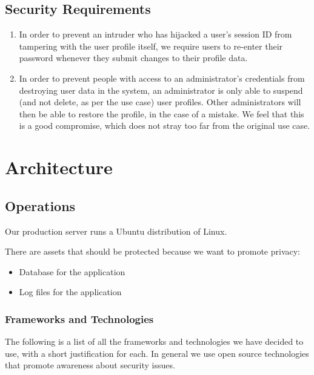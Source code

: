 \documentclass[a4paper]{article}
\begin{document}
\subsection{Security Requirements}
\begin{enumerate}
\item In order to prevent an intruder who has hijacked a user's session ID from tampering with the user profile itself, we require users to re-enter their password whenever they submit changes to their profile data.
\item In order to prevent people with access to an administrator's credentials from destroying user data in the system, an administrator is only able to suspend (and not delete, as per the use case) user profiles. Other administrators will then be able to restore the profile, in the case of a mistake. We feel that this is a good compromise, which does not stray too far from the original use case.
\end{enumerate}

\section{Architecture}\label{sec:architecture}


\subsection{Operations}
Our production server runs a Ubuntu distribution of Linux.

There are assets that should be protected because we want to promote privacy:
\begin{itemize}
\item Database for the application
\item Log files for the application
\end{itemize}

\subsubsection{Frameworks and Technologies}
The following is a list of all the frameworks and technologies we have decided to use, with a short justification for each. In general we use open source technologies that promote awareness about security issues.
\end{document}
